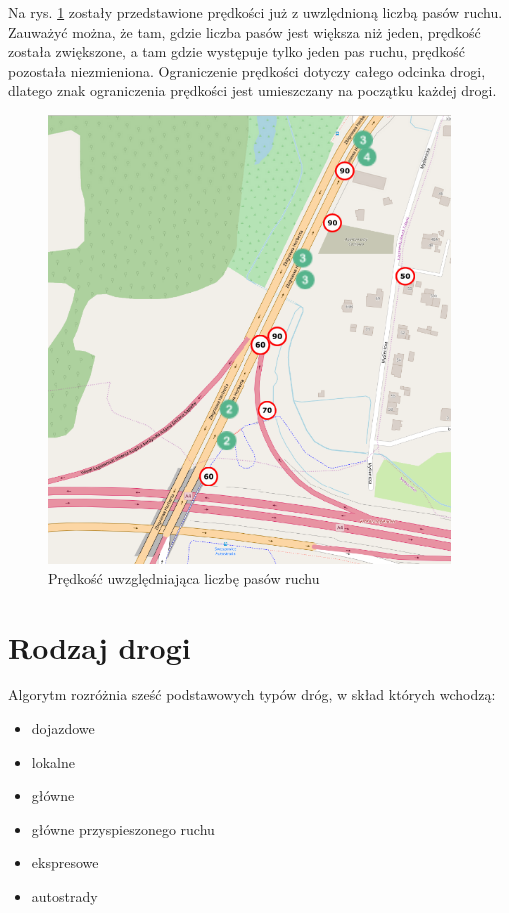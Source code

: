 \newpage
Na rys. \ref{sec:laneNumberAfter} zostały przedstawione prędkości już z uwzlędnioną liczbą pasów ruchu. Zauważyć można, że tam, gdzie liczba pasów jest większa niż jeden, prędkość została zwiększone, a tam gdzie występuje tylko jeden pas ruchu, prędkość pozostała niezmieniona. Ograniczenie prędkości dotyczy całego odcinka drogi, dlatego znak ograniczenia prędkości jest umieszczany na początku każdej drogi.
\begin{figure}[h]
\caption{Prędkość uwzględniająca liczbę pasów ruchu}
\label{sec:laneNumberAfter}
\centering
\includegraphics[width=0.95\textwidth]{laneNumberAfter}
\end{figure}

\newpage
\section{Rodzaj drogi}
\label{sec:typeOfRoad}
Algorytm rozróżnia sześć podstawowych typów dróg, w skład których wchodzą:
\begin{itemize}
\item dojazdowe
\item lokalne
\item główne
\item główne przyspieszonego ruchu
\item ekspresowe
\item autostrady
\end{itemize}

